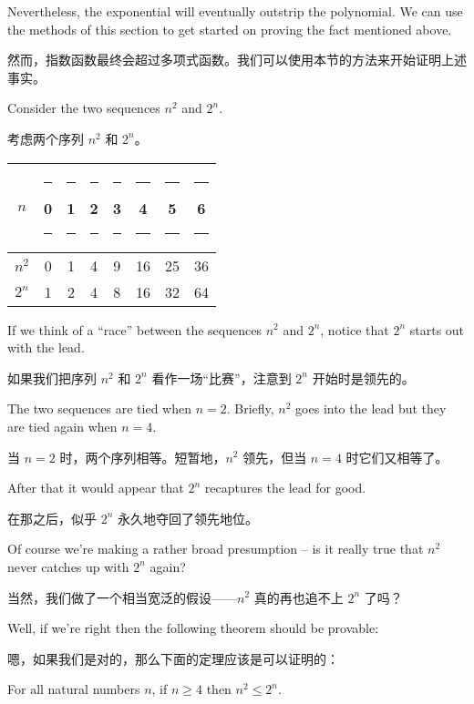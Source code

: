 Nevertheless, the exponential will eventually outstrip the polynomial.
We can use the methods of this section to get started on proving the fact 
mentioned above.

然而，指数函数最终会超过多项式函数。我们可以使用本节的方法来开始证明上述事实。

Consider the two sequences $n^2$ and $2^n$. 

考虑两个序列 $n^2$ 和 $2^n$。

\begin{center}
\begin{tabular}{c|ccccccc}
$n$   & \rule{6pt}{0pt} 0 \rule{6pt}{0pt} & \rule{6pt}{0pt} 1 \rule{6pt}{0pt} & \rule{6pt}{0pt} 2 \rule{6pt}{0pt} & \rule{6pt}{0pt} 3 \rule{6pt}{0pt} & \rule{6pt}{0pt} 4 \rule{6pt}{0pt} & \rule{6pt}{0pt} 5 \rule{6pt}{0pt} & \rule{6pt}{0pt} 6 \rule{6pt}{0pt} \\ \hline
$n^2$  & 0 & 1 & 4 & 9 & 16 & 25 & 36 \\ \hline
$2^n$ & 1 & 2 & 4 & 8 & 16 & 32 & 64 \\ 
\end{tabular}
\end{center}

If we think of a ``race'' between the sequences $n^2$ and $2^n$, notice
that $2^n$ starts out with the lead.

如果我们把序列 $n^2$ 和 $2^n$ 看作一场“比赛”，注意到 $2^n$ 开始时是领先的。

The two sequences are tied when 
$n=2$.  Briefly, $n^2$ goes into the lead but they are tied again when
$n=4$.

当 $n=2$ 时，两个序列相等。短暂地，$n^2$ 领先，但当 $n=4$ 时它们又相等了。

After that it would appear that $2^n$ recaptures the lead for good.

在那之后，似乎 $2^n$ 永久地夺回了领先地位。

Of course we're making a rather broad presumption -- is it really true
that $n^2$ never catches up with $2^n$ again?

当然，我们做了一个相当宽泛的假设——$n^2$ 真的再也追不上 $2^n$ 了吗？

Well, if we're right 
then the following theorem should be provable:

嗯，如果我们是对的，那么下面的定理应该是可以证明的：

\begin{thm} 
For all natural numbers $n$, if $n \geq 4$ then $n^2 \leq 2^n$.
\end{thm}
 
